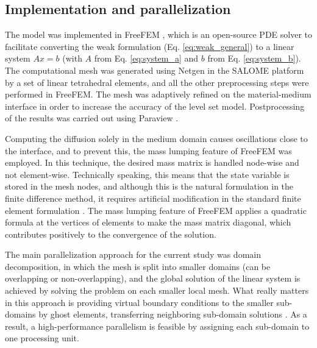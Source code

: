 \subsection{Implementation and parallelization}

The model was implemented in FreeFEM \cite{Hecht2012}, which is an open-source \gls{PDE} solver to facilitate converting the weak formulation (Eq. \ref{eq:weak_general}) to a linear system $Ax=b$ (with $A$ from Eq. \ref{eq:system_a} and $b$ from Eq. \ref{eq:system_b}). The computational mesh was generated using Netgen \cite{Schoeberl1997} in the SALOME platform \cite{Ribes2007} by a set of linear tetrahedral elements, and all the other preprocessing steps were performed in FreeFEM. The mesh was adaptively refined on the material-medium interface in order to increase the accuracy of the level set model. Postprocessing of the results was carried out using  Paraview \cite{Ahrens2005}.

Computing the diffusion solely in the medium domain causes oscillations close to the interface, and to prevent this, the mass lumping feature of FreeFEM was employed. In this technique, the desired mass matrix is handled node-wise and not element-wise. Technically speaking, this means that the state variable is stored in the mesh nodes, and although this is the natural formulation in the finite difference method, it requires artificial modification in the standard finite element formulation \cite{Wendland2005}. The mass lumping feature of FreeFEM applies a quadratic formula at the vertices of elements to make the mass matrix diagonal, which contributes positively to the convergence of the solution.


The main parallelization approach for the current study was domain decomposition, in which the mesh is split into smaller domains (can be overlapping or non-overlapping), and the global solution of the linear system is achieved by solving the problem on each smaller local mesh. What really matters in this approach is providing virtual boundary conditions to the smaller sub-domains by ghost elements, transferring neighboring sub-domain solutions \cite{Badri2018}. As a result, a high-performance parallelism is feasible by assigning each sub-domain to one processing unit.

